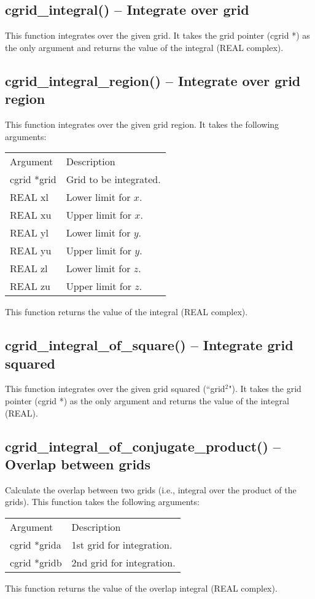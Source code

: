 \documentclass[12pt,letterpaper]{report}
\begin{document}
\subsection{cgrid\_integral() -- Integrate over grid}

This function integrates over the given grid. It takes the grid pointer (cgrid *) as the only argument and returns the value of the integral (REAL complex). 

\subsection{cgrid\_integral\_region() -- Integrate over grid region}

This function integrates over the given grid region. It takes the following arguments:
\begin{longtable}{p{} p{}}
Argument & Description\\
\cline{1-2}
cgrid *grid & Grid to be integrated.\\
REAL xl & Lower limit for $x$.\\
REAL xu & Upper limit for $x$.\\
REAL yl & Lower limit for $y$.\\
REAL yu & Upper limit for $y$.\\
REAL zl & Lower limit for $z$.\\
REAL zu & Upper limit for $z$.\\
\end{longtable}
\noindent
This function returns the value of the integral (REAL complex). 

\subsection{cgrid\_integral\_of\_square() -- Integrate grid squared}

This function integrates over the given grid squared (``grid$^2$"). It takes the grid pointer (cgrid *) as the only argument and returns the value of the integral (REAL).

\subsection{cgrid\_integral\_of\_conjugate\_product() -- Overlap between grids}

Calculate the overlap between two grids (i.e., integral over the product of the grids). This function takes the following arguments:
\begin{longtable}{p{} p{}}
Argument & Description\\
\cline{1-2}
cgrid *grida & 1st grid for integration.\\
cgrid *gridb & 2nd grid for integration.\\
\end{longtable}
\noindent
This function returns the value of the overlap integral (REAL complex).
\end{document}
